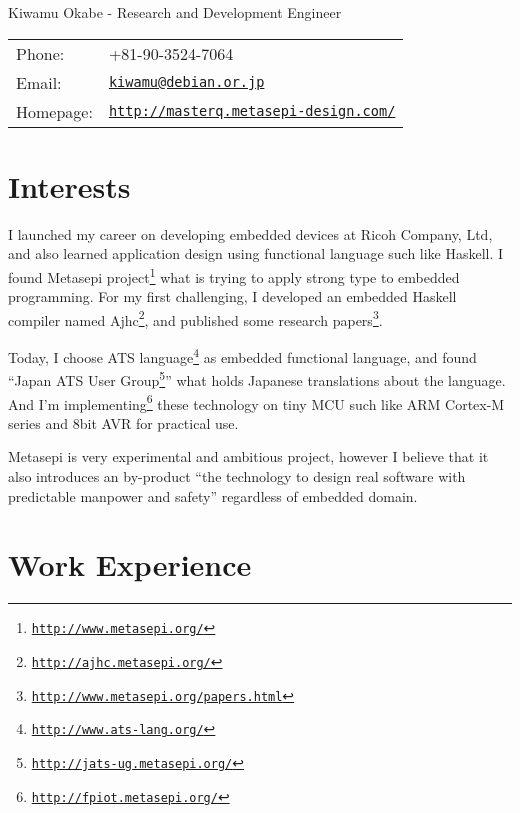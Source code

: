 \documentclass[letterpaper]{article}
\def\name{Kiwamu Okabe - Research and Development Engineer}
\begin{document}
{\huge \name}


\vspace{0.25in}

\begin{minipage}{0.3\linewidth}
  \begin{tabular}{ll}
    Phone: & +81-90-3524-7064 \\
    Email: & \href{mailto:kiwamu@debian.or.jp}{\tt kiwamu@debian.or.jp} \\
    Homepage: & \href{http://masterq.metasepi-design.com/}{\tt http://masterq.metasepi-design.com/} \\
  \end{tabular}
\end{minipage}

\section*{Interests}

I launched my career on developing embedded devices at Ricoh Company, Ltd, and also learned application design using functional language such like Haskell. I found Metasepi project\footnote{\href{http://www.metasepi.org/}{\tt http://www.metasepi.org/}} what is trying to apply strong type to embedded programming. For my first challenging, I developed an embedded Haskell compiler named Ajhc\footnote{\href{http://ajhc.metasepi.org/}{\tt http://ajhc.metasepi.org/}}, and published some research papers\footnote{\href{http://www.metasepi.org/papers.html}{\tt http://www.metasepi.org/papers.html}}.

Today, I choose ATS language\footnote{\href{http://www.ats-lang.org/}{\tt http://www.ats-lang.org/}} as embedded functional language, and found ``Japan ATS User Group\footnote{\href{http://jats-ug.metasepi.org/}{\tt http://jats-ug.metasepi.org/}}'' what holds Japanese translations about the language. And I'm implementing\footnote{\href{http://fpiot.metasepi.org/}{\tt http://fpiot.metasepi.org/}} these technology on tiny MCU such like ARM Cortex-M series and 8bit AVR for practical use.

Metasepi is very experimental and ambitious project, however I believe that it also introduces an by-product ``the technology to design real software with predictable manpower and safety'' regardless of embedded domain.

\section*{Work Experience}
\end{document}
